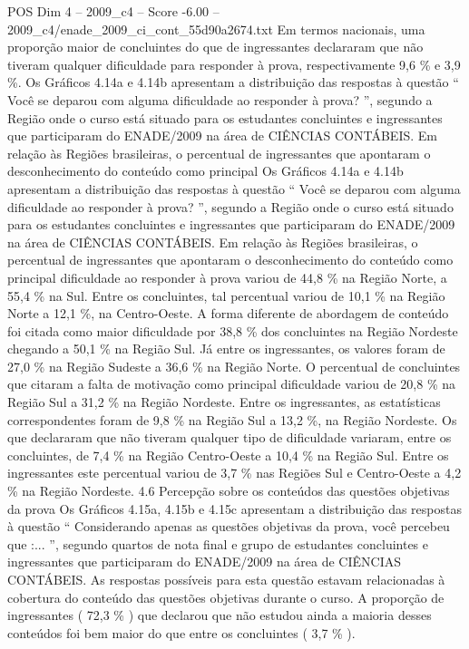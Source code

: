 \begin{textsample}{POS Dim 4 – 2009\_c4 – Score -6.00 – 2009\_c4/enade\_2009\_ci\_cont\_55d90a2674.txt}
Em termos nacionais, uma proporção maior de concluintes do que de ingressantes declararam que não tiveram qualquer dificuldade para responder à prova, respectivamente 9,6 \% e 3,9 \%.
Os Gráficos 4.14a e 4.14b apresentam a distribuição das respostas à questão “ Você se deparou com alguma dificuldade ao responder à prova? ”, segundo a Região onde o curso está situado para os estudantes concluintes e ingressantes que participaram do ENADE/2009 na área de CIÊNCIAS CONTÁBEIS.
Em relação às Regiões brasileiras, o percentual de ingressantes que apontaram o desconhecimento do conteúdo como principal Os Gráficos 4.14a e 4.14b apresentam a distribuição das respostas à questão “ Você se deparou com alguma dificuldade ao responder à prova? ”, segundo a Região onde o curso está situado para os estudantes concluintes e ingressantes que participaram do ENADE/2009 na área de CIÊNCIAS CONTÁBEIS.
Em relação às Regiões brasileiras, o percentual de ingressantes que apontaram o desconhecimento do conteúdo como principal dificuldade ao responder à prova variou de 44,8 \% na Região Norte, a 55,4 \% na Sul.
Entre os concluintes, tal percentual variou de 10,1 \% na Região Norte a 12,1 \%, na Centro-Oeste.
A forma diferente de abordagem de conteúdo foi citada como maior dificuldade por 38,8 \% dos concluintes na Região Nordeste chegando a 50,1 \% na Região Sul.
Já entre os ingressantes, os valores foram de 27,0 \% na Região Sudeste a 36,6 \% na Região Norte.
O percentual de concluintes que citaram a falta de motivação como principal dificuldade variou de 20,8 \% na Região Sul a 31,2 \% na Região Nordeste.
Entre os ingressantes, as estatísticas correspondentes foram de 9,8 \% na Região Sul a 13,2 \%, na Região Nordeste.
Os que declararam que não tiveram qualquer tipo de dificuldade variaram, entre os concluintes, de 7,4 \% na Região Centro-Oeste a 10,4 \% na Região Sul.
Entre os ingressantes este percentual variou de 3,7 \% nas Regiões Sul e Centro-Oeste a 4,2 \% na Região Nordeste. 4.6 Percepção sobre os conteúdos das questões objetivas da prova Os Gráficos 4.15a, 4.15b e 4.15c apresentam a distribuição das respostas à questão “ Considerando apenas as questões objetivas da prova, você percebeu que :... ”, segundo quartos de nota final e grupo de estudantes concluintes e ingressantes que participaram do ENADE/2009 na área de CIÊNCIAS CONTÁBEIS.
As respostas possíveis para esta questão estavam relacionadas à cobertura do conteúdo das questões objetivas durante o curso.
A proporção de ingressantes ( 72,3 \% ) que declarou que não estudou ainda a maioria desses conteúdos foi bem maior do que entre os concluintes ( 3,7 \% ).

\end{textsample}
